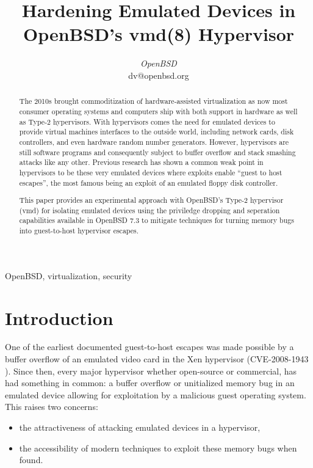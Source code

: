 \documentclass[conference]{IEEEtran}
\begin{document}
\title{Hardening Emulated Devices in OpenBSD's vmd(8) Hypervisor}

\author{
\textit{OpenBSD}\\
dv@openbsd.org}

\maketitle

\begin{abstract}
  The 2010s brought commoditization of hardware-assisted
  virtualization as now most consumer operating systems and computers
  ship with both support in hardware as well as Type-2
  hypervisors. With hypervisors comes the need for emulated devices to
  provide virtual machines interfaces to the outside world, including
  network cards, disk controllers, and even hardware random number
  generators. However, hypervisors are still software programs and
  consequently subject to buffer overflow and stack smashing attacks
  like any other. Previous research has shown a common weak point in
  hypervisors to be these very emulated devices where exploits enable
  ``guest to host escapes'', the most famous being an exploit of an
  emulated floppy disk controller.

  This paper provides an experimental approach with OpenBSD's Type-2
  hypervisor (vmd) for isolating emulated devices using the priviledge
  dropping and seperation capabilities available in OpenBSD 7.3 to
  mitigate techniques for turning memory bugs into guest-to-host
  hypervisor escapes.
\end{abstract}


\begin{IEEEkeywords}
OpenBSD, virtualization, security
\end{IEEEkeywords}

\section{Introduction}
One of the earliest documented guest-to-host escapes was made possible
by a buffer overflow of an emulated video card in the Xen hypervisor
(CVE-2008-1943 \cite{b1}). Since then, every major hypervisor whether
open-source or commercial, has had something in common: a buffer
overflow or unitialized memory bug in an emulated device allowing for
exploitation by a malicious guest operating system. This raises two
concerns:

\begin{itemize}
\item the attractiveness of attacking emulated devices in a hypervisor,
\item the accessibility of modern techniques to exploit these memory
  bugs when found.
\end{itemize}
\end{document}
